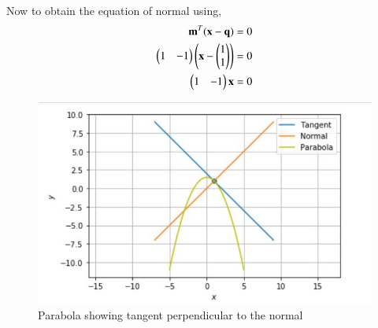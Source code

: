 Now to obtain the equation of normal using,
\begin{align}
    \mathbf{m}^T(\mathbf{x} - \mathbf{q}) &= 0 \\
    \begin{pmatrix}1 & -1\end{pmatrix}\begin{pmatrix}\mathbf{x} - \begin{pmatrix}1 \\ 1\end{pmatrix}\end{pmatrix} &= 0 \\
    \begin{pmatrix}1 & -1\end{pmatrix}\mathbf{x} &= 0 
\end{align}
\begin{figure}[h!]
\centering
\includegraphics[width=\columnwidth]{./solutions/conics/1/22/Plot.JPG}
\caption{{Parabola showing tangent perpendicular to the normal}}
\label{eq:solutions/1/22/myfig}
\end{figure}
